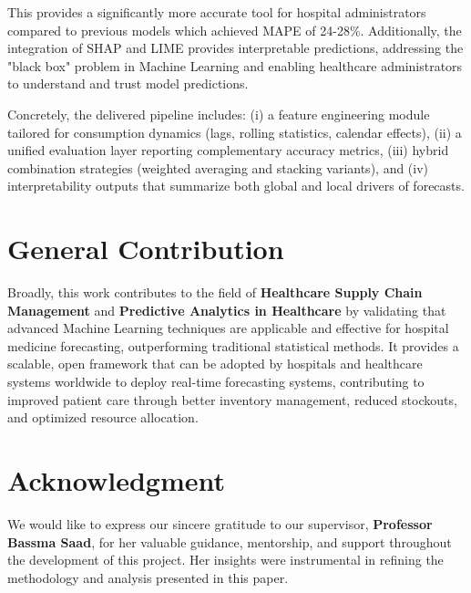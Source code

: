 \documentclass[conference]{IEEEtran}
\begin{document}
This provides a significantly more accurate tool for hospital administrators compared to previous models which achieved MAPE of 24-28\%. Additionally, the integration of SHAP and LIME provides interpretable predictions, addressing the "black box" problem in Machine Learning and enabling healthcare administrators to understand and trust model predictions.

Concretely, the delivered pipeline includes: (i) a feature engineering module tailored for consumption dynamics (lags, rolling statistics, calendar effects), (ii) a unified evaluation layer reporting complementary accuracy metrics, (iii) hybrid combination strategies (weighted averaging and stacking variants), and (iv) interpretability outputs that summarize both global and local drivers of forecasts.

\section{General Contribution}

Broadly, this work contributes to the field of \textbf{Healthcare Supply Chain Management} and \textbf{Predictive Analytics in Healthcare} by validating that advanced Machine Learning techniques are applicable and effective for hospital medicine forecasting, outperforming traditional statistical methods. It provides a scalable, open framework that can be adopted by hospitals and healthcare systems worldwide to deploy real-time forecasting systems, contributing to improved patient care through better inventory management, reduced stockouts, and optimized resource allocation.

\FloatBarrier
\section*{Acknowledgment}

We would like to express our sincere gratitude to our supervisor, \textbf{Professor Bassma Saad}, for her valuable guidance, mentorship, and support throughout the development of this project. Her insights were instrumental in refining the methodology and analysis presented in this paper.
\end{document}
